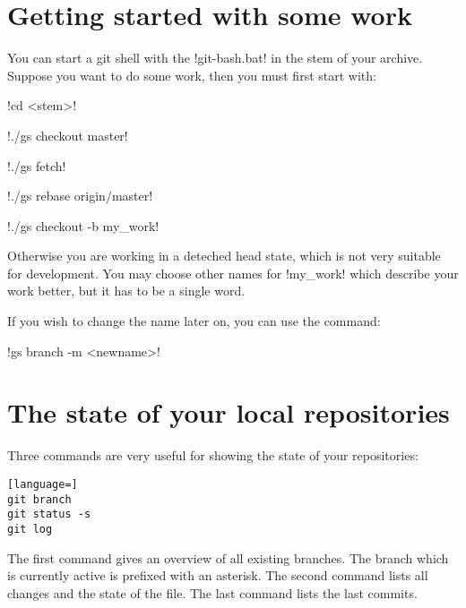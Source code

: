 \section{Getting started with some work \label{sec:git.start2}}

You can start a git shell with the !git-bash.bat! in the stem of your archive.
Suppose you want to do some work, then you must first start with:

\begin{enumerate*}
\item !cd <stem>!
\item !./gs checkout master!
\item !./gs fetch!
\item !./gs rebase origin/master!
\item !./gs checkout -b my_work!
\end{enumerate*}

Otherwise you are working in a deteched head state, which is not very suitable for
development. You may choose other names for !my_work! which describe your work better,
but it has to be a single word.

If you wish to change the name later on, you can use the command:

\begin{enumerate*}
\item !gs branch -m <newname>!
\end{enumerate*}

\section{The state of your local repositories}

Three commands are very useful for showing the state of your repositories:


\begin{lstlisting}[language=]
git branch
git status -s
git log
\end{lstlisting}

\noindent
The first command gives an overview of all existing branches. The branch which
is currently active is prefixed with an asterisk. The second command lists all
changes and the state of the file. The last command lists the last commits.

